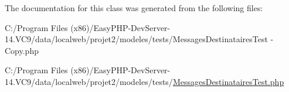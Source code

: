 The documentation for this class was generated from the following files\+:\begin{DoxyCompactItemize}
\item 
C\+:/\+Program Files (x86)/\+Easy\+P\+H\+P-\/\+Dev\+Server-\/14.\+V\+C9/data/localweb/projet2/modeles/tests/Messages\+Destinataires\+Test -\/ Copy.\+php\item 
C\+:/\+Program Files (x86)/\+Easy\+P\+H\+P-\/\+Dev\+Server-\/14.\+V\+C9/data/localweb/projet2/modeles/tests/\hyperlink{_messages_destinataires_test_8php}{Messages\+Destinataires\+Test.\+php}\end{DoxyCompactItemize}
